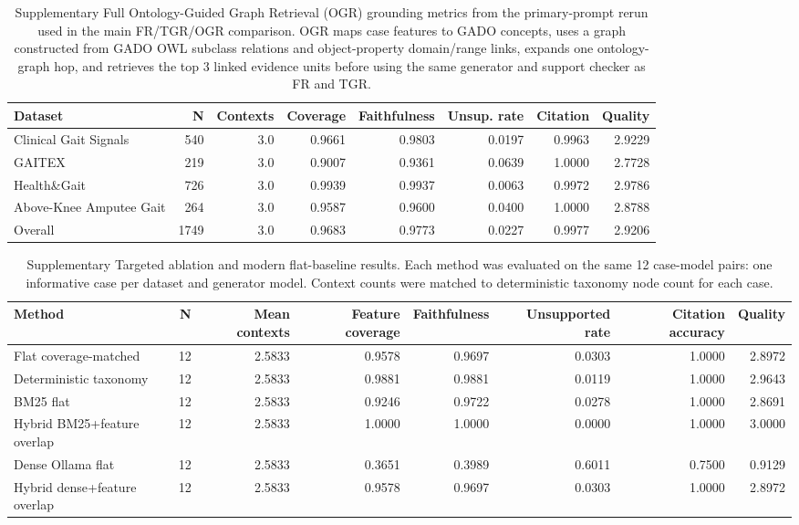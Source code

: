 \documentclass{article}
\begin{document}
\begin{table}[!ht]
\caption{Supplementary Full Ontology-Guided Graph Retrieval (OGR) grounding metrics from the primary-prompt rerun used in the main FR/TGR/OGR comparison. OGR maps case features to GADO concepts, uses a graph constructed from GADO OWL subclass relations and object-property domain/range links, expands one ontology-graph hop, and retrieves the top 3 linked evidence units before using the same generator and support checker as FR and TGR.}
\label{stab:ogr-full-metrics}
\centering
\scriptsize
\begin{adjustbox}{max width=\textwidth}
\begin{tabular}{@{}lrrrrrrr@{}}
\toprule
Dataset & N & Contexts & Coverage & Faithfulness & Unsup. rate & Citation & Quality \\
\midrule
Clinical Gait Signals & 540 & 3.0 & 0.9661 & 0.9803 & 0.0197 & 0.9963 & 2.9229 \\
GAITEX & 219 & 3.0 & 0.9007 & 0.9361 & 0.0639 & 1.0000 & 2.7728 \\
Health\&Gait & 726 & 3.0 & 0.9939 & 0.9937 & 0.0063 & 0.9972 & 2.9786 \\
Above-Knee Amputee Gait & 264 & 3.0 & 0.9587 & 0.9600 & 0.0400 & 1.0000 & 2.8788 \\
\midrule
Overall & 1749 & 3.0 & 0.9683 & 0.9773 & 0.0227 & 0.9977 & 2.9206 \\
\bottomrule
\end{tabular}
\end{adjustbox}
\end{table}

\begin{table}[!ht]
\caption{Supplementary Targeted ablation and modern flat-baseline results. Each method was evaluated on the same 12 case-model pairs: one informative case per dataset and generator model. Context counts were matched to deterministic taxonomy node count for each case.}
\label{stab:targeted-ablation-baselines}
\centering
\scriptsize
\begin{adjustbox}{max width=\textwidth}
\begin{tabular}{@{}lrrrrrrr@{}}
\toprule
Method & N & Mean contexts & Feature coverage & Faithfulness & Unsupported rate & Citation accuracy & Quality \\
\midrule
Flat coverage-matched & 12 & 2.5833 & 0.9578 & 0.9697 & 0.0303 & 1.0000 & 2.8972 \\
Deterministic taxonomy & 12 & 2.5833 & 0.9881 & 0.9881 & 0.0119 & 1.0000 & 2.9643 \\
BM25 flat & 12 & 2.5833 & 0.9246 & 0.9722 & 0.0278 & 1.0000 & 2.8691 \\
Hybrid BM25+feature overlap & 12 & 2.5833 & 1.0000 & 1.0000 & 0.0000 & 1.0000 & 3.0000 \\
Dense Ollama flat & 12 & 2.5833 & 0.3651 & 0.3989 & 0.6011 & 0.7500 & 0.9129 \\
Hybrid dense+feature overlap & 12 & 2.5833 & 0.9578 & 0.9697 & 0.0303 & 1.0000 & 2.8972 \\
\bottomrule
\end{tabular}
\end{adjustbox}
\end{table}
\end{document}
